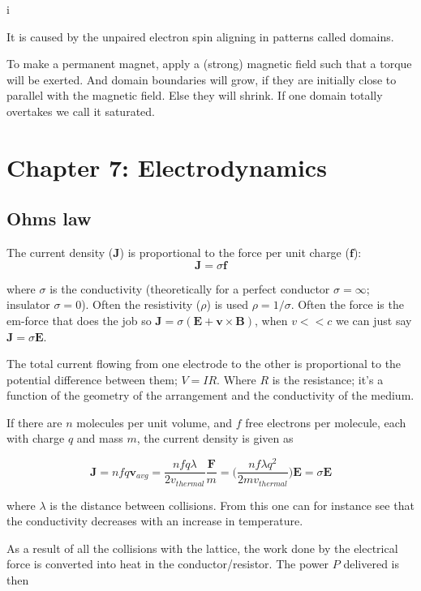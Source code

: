 i\documentclass[a4paper]{article}
\begin{document}
It is caused by the unpaired electron spin aligning in patterns called domains. 

To make a permanent magnet, apply a (strong) magnetic field such that a torque will be exerted. And domain boundaries will grow, if they are initially close to parallel with the magnetic field. Else they will shrink. If one domain totally overtakes we call it saturated.

\section{Chapter 7: Electrodynamics}

\subsection{Ohms law}
The current density ($\bm{J}$) is proportional to the force per unit charge ($\bm{f}$):
\begin{equation}
    \bm{J}=\sigma\bm{f}
\end{equation}

where $\sigma$ is the conductivity (theoretically for a perfect conductor $\sigma=\infty$; insulator $\sigma=0$). Often the resistivity ($\rho$) is used $\rho = 1 / \sigma$. Often the force is the em-force that does the job so $\bm{J}=\sigma(\bm{E}+\bm{v}\times\bm{B})$, when $v<<c$ we can just say $\bm{J}=\sigma\bm{E}$. 

\bigskip

The total current flowing from one electrode to the other is proportional to the potential difference between them; $V=IR$. Where $R$ is the resistance; it's a function of the geometry of the arrangement and the conductivity of the medium. 

\bigskip

If there are $n$ molecules per unit volume, and $f$ free electrons per molecule, each with charge $q$ and mass $m$, the current density is given as

\begin{equation}
    \bm{J}=nfq\bm{v}_{avg}=\frac{nfq\lambda}{2v_{thermal}}\frac{\bm{F}}{m}=\bigg(\frac{nf\lambda q^2}{2mv_{thermal}}\bigg)\bm{E}=\sigma\bm{E}
\end{equation}

where $\lambda$ is the distance between collisions. From this one can for instance see that the conductivity decreases with an increase in temperature. 

\bigskip

As a result of all the collisions with the lattice, the work done by the electrical force is converted into heat in the conductor/resistor. The power $P$ delivered is then 
\end{document}
